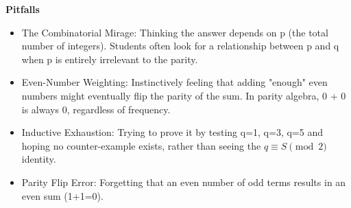 \documentclass{article}
\begin{document}
\noindent \textbf{Pitfalls}
\begin{itemize}
    \item The Combinatorial Mirage: Thinking the answer depends on p (the total number of integers). Students often look for a relationship between p and q when p is entirely irrelevant to the parity.
    \item Even-Number Weighting: Instinctively feeling that adding "enough" even numbers might eventually flip the parity of the sum. In parity algebra, 0 + 0 is always 0, regardless of frequency.
    \item Inductive Exhaustion: Trying to prove it by testing q=1, q=3, q=5 and hoping no counter-example exists, rather than seeing the $q \equiv S \pmod 2$ identity.
    \item Parity Flip Error: Forgetting that an even number of odd terms results in an even sum (1+1=0).
\end{itemize}
\end{document}
